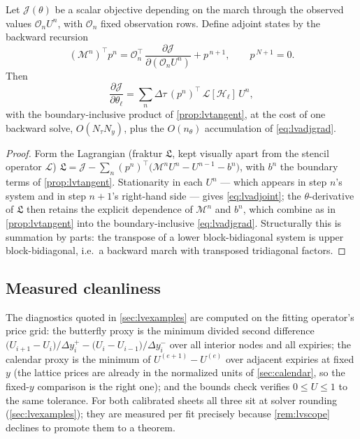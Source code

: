 \begin{proposition}
\label{prop:lvadjoint}
Let $\mathcal J(\theta)$ be a scalar objective depending on the march
through the observed values $\mathcal O_nU^{n}$, with $\mathcal O_n$ fixed
observation rows.  Define adjoint states by the backward recursion
\begin{equation}
(\mathcal M^{n})^{\!\top}p^{n}
=\mathcal O_n^{\top}\,
\frac{\partial\mathcal J}{\partial(\mathcal O_nU^{n})}+p^{\,n+1},
\qquad p^{\,N+1}=0 .
\label{eq:lvadjoint}
\end{equation}
Then
\begin{equation}
\frac{\partial\mathcal J}{\partial\theta_\ell}
=\sum_{n}\Delta\tau\,(p^{n})^{\!\top}\,
\mathcal L[\mathcal H_\ell]\,U^{n},
\label{eq:lvadjgrad}
\end{equation}
with the boundary-inclusive product of \cref{prop:lvtangent}, at the cost
of one backward solve, $O(N_\tau N_y)$, plus the $O(n_\theta)$
accumulation of \eqref{eq:lvadjgrad}.
\end{proposition}

\begin{proof}
Form the Lagrangian (fraktur $\mathfrak L$, kept visually apart from
the stencil operator $\mathcal L$)
$\mathfrak{L}=\mathcal J-\sum_n (p^{n})^{\top}
\big(\mathcal M^{n}U^{n}-U^{n-1}-b^{n}\big)$, with $b^{n}$ the boundary
terms of \cref{prop:lvtangent}.  Stationarity in each $U^{n}$ --- which
appears in step $n$'s system and in step $n{+}1$'s right-hand side ---
gives \eqref{eq:lvadjoint}; the $\theta$-derivative of $\mathfrak{L}$ then
retains the explicit dependence of $\mathcal M^{n}$ and $b^{n}$, which
combine as in \cref{prop:lvtangent} into the boundary-inclusive
\eqref{eq:lvadjgrad}.  Structurally this is summation by parts: the
transpose of a lower block-bidiagonal system is upper block-bidiagonal,
i.e.\ a backward march with transposed tridiagonal factors.
\end{proof}

\subsection{Measured cleanliness}
\label{app:lvdiag}

The diagnostics quoted in \cref{sec:lvexamples} are computed on the
fitting operator's price grid: the butterfly proxy is the minimum divided
second difference $\big(U_{i+1}-U_i\big)/\Delta y_i^{+}
-\big(U_i-U_{i-1}\big)/\Delta y_i^{-}$ over all interior nodes and all
expiries; the calendar proxy is the minimum of
$U^{(e+1)}-U^{(e)}$ over adjacent expiries at fixed $y$ (the lattice
prices are already in the normalized units of \cref{sec:calendar}, so the
fixed-$y$ comparison is the right one); and the bounds check verifies
$0\le U\le1$ to the same tolerance.  For both calibrated sheets all three
sit at solver rounding (\cref{sec:lvexamples}); they are measured per fit
precisely because \cref{rem:lvscope} declines to promote them to a
theorem.
